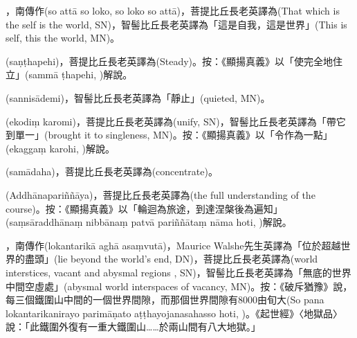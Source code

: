 \startitemgroup[noteitems]
\item{}，南傳作(so attā so loko, so loko so attā)，菩提比丘長老英譯為(That which is the self is the world, SN)，智髻比丘長老英譯為「這是自我，這是世界」(This is self, this the world, MN)。
\stopitemgroup

\startitemgroup[noteitems]
\item{}(saṇṭhapehi)，菩提比丘長老英譯為(Steady)。按：《顯揚真義》以「使完全地住立」(sammā ṭhapehi, )解說。
\item{}(sannisādemi)，智髻比丘長老英譯為「靜止」(quieted, MN)。
\item{}(ekodiṃ karomi)，菩提比丘長老英譯為(unify, SN)，智髻比丘長老英譯為「帶它到單一」(brought it to singleness, MN)。按：《顯揚真義》以「令作為一點」(ekaggaṃ karohi, )解說。
\item{}(samādaha)，菩提比丘長老英譯為(concentrate)。
\stopitemgroup

\startitemgroup[noteitems]
\item{}(Addhānapariññāya)，菩提比丘長老英譯為(the full understanding of the course)。按：《顯揚真義》以「輪迴為旅途，到達涅槃後為遍知」(saṃsāraddhānaṃ nibbānaṃ patvā pariññātaṃ nāma hoti, )解說。
\stopitemgroup

\startitemgroup[noteitems]
\item{}，南傳作(lokantarikā aghā asaṃvutā)，Maurice Walshe先生英譯為「位於超越世界的盡頭」(lie beyond the world's end, DN)，菩提比丘長老英譯為(world interstices, vacant and abysmal regions , SN)，智髻比丘長老英譯為「無底的世界中間空虛處」(abysmal world interspaces of vacancy, MN)。按：《破斥猶豫》說，每三個鐵圍山中間的一個世界間隙，而那個世界間隙有8000由旬大(So pana lokantarikanirayo parimāṇato aṭṭhayojanasahasso hoti, )。《起世經》〈地獄品〉說：「此鐵圍外復有一重大鐵圍山……於兩山間有八大地獄。」
\stopitemgroup

